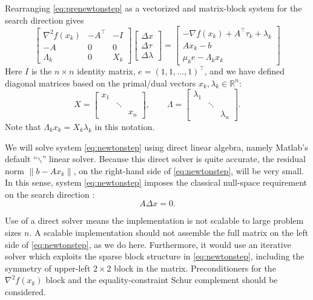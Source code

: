 \documentclass[11pt]{article}
\newcommand{\RR}{\mathbb{R}}
\newcommand{\grad}{\nabla}
\begin{document}
Rearranging \eqref{eq:prenewtonstep} as a vectorized and matrix-block system for the search direction gives
\begin{equation}
\begin{bmatrix}
\grad^2 f(x_k) & -A^\top & -I \\
-A             & 0       & 0  \\
\Lambda_k      & 0       & X_k
\end{bmatrix}
\begin{bmatrix}
\Delta x \\
\Delta \tau \\
\Delta \lambda
\end{bmatrix}
=
\begin{bmatrix}
-\grad f(x_k) + A^\top \tau_k + \lambda_k \\
A x_k - b \\
\mu_k e - \Lambda_k x_k
\end{bmatrix} \label{eq:newtonstep}
\end{equation}
Here $I$ is the $n\times n$ identity matrix, $e=(1,1,\dots,1)^\top$, and we have defined diagonal matrices based on the primal/dual vectors $x_k,\lambda_k\in\RR^n$:
    $$X = \begin{bmatrix} x_1 & & \\ & \ddots & \\ & & x_n \end{bmatrix}, \qquad \Lambda = \begin{bmatrix} \lambda_1 & & \\ & \ddots & \\ & & \lambda_n \end{bmatrix}.$$
Note that $\Lambda_k x_k = X_k \lambda_k$ in this notation.

We will solve system \eqref{eq:newtonstep} using direct linear algebra, namely Matlab's default ``$\backslash$'' linear solver.  Because this direct solver is quite accurate, the residual norm $\|b-A x_k\|$, on the right-hand side of \eqref{eq:newtonstep}, will be very small.  In this sense, system \eqref{eq:newtonstep} imposes the classical null-space requirement on the search direction \cite[chapter 3]{GrivaNashSofer2009}:
\begin{equation}
A \Delta x = 0.  \label{eq:dxnull}
\end{equation}

Use of a direct solver means the implementation is not scalable to large problem sizes $n$.  A scalable implementation should not assemble the full matrix on the left side of \eqref{eq:newtonstep}, as we do here.  Furthermore, it would use an iterative solver which exploits the sparse block structure in \eqref{eq:newtonstep}, including the symmetry of upper-left $2\times 2$ block in the matrix.  Preconditioners \cite{Bueler2021} for the $\grad^2 f(x_k)$ block and the equality-constraint Schur complement \cite[chapters 14]{Bueler2021} should be considered.
\end{document}
